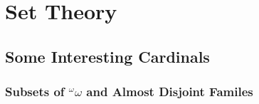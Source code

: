 \documentclass{article}
\begin{document}
\section{Set Theory}

\subsection{Some Interesting Cardinals}
\subsubsection{Subsets of ${}^\omega\omega$ and Almost Disjoint Familes}
\end{document}
